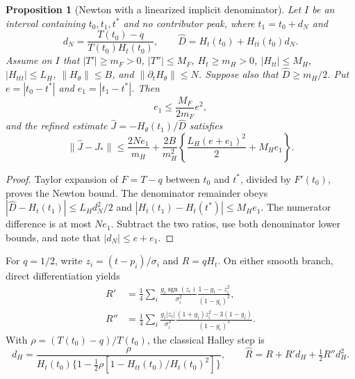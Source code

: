 \documentclass[11pt,a4paper]{article}
\newtheorem{proposition}[theorem]{Proposition}
\newcommand{\sgn}{\operatorname{sgn}}
\begin{document}
\begin{proposition}[Newton with a linearized implicit denominator]
Let $I$ be an interval containing $t_0,t_1,t^*$ and no contributor peak,
where $t_1=t_0+d_N$ and
\[
 d_N=\frac{T(t_0)-q}{T(t_0)H_t(t_0)},\qquad
 \widehat D=H_t(t_0)+H_{tt}(t_0)d_N.
\]
Assume on $I$ that $|T'|\geq m_F>0$, $|T''|\leq M_F$,
$H_t\geq m_H>0$, $|H_{tt}|\leq M_H$, $|H_{ttt}|\leq L_H$,
$\|H_\theta\|\leq B$, and $\|\partial_tH_\theta\|\leq N$.
Suppose also that $\widehat D\geq m_H/2$. Put $e=|t_0-t^*|$
and $e_1=|t_1-t^*|$. Then
\[
 e_1\leq\frac{M_F}{2m_F}e^2,
\]
and the refined estimate $\widehat J=-H_\theta(t_1)/\widehat D$ satisfies
\[
 \|\widehat J-J_*\|\leq
 \frac{2Ne_1}{m_H}+\frac{2B}{m_H^2}
 \left\{\frac{L_H(e+e_1)^2}{2}+M_He_1\right\}.
\]
\end{proposition}
\begin{proof}
Taylor expansion of $F=T-q$ between $t_0$ and $t^*$, divided by
$F'(t_0)$, proves the Newton bound. The denominator remainder obeys
$|\widehat D-H_t(t_1)|\leq L_Hd_N^2/2$ and
$|H_t(t_1)-H_t(t^*)|\leq M_He_1$. The numerator difference is at
most $Ne_1$. Subtract the two ratios, use both denominator lower bounds,
and note that $|d_N|\leq e+e_1$.
\end{proof}

For $q=1/2$, write $z_i=(t-p_i)/\sigma_i$ and $R=qH_t$.
On either smooth branch, direct differentiation yields
\begin{align}
 R'&=\frac14\sum_i\frac{g_i\sgn(z_i)}{\sigma_i^2}
       \frac{1-g_i-z_i^2}{(1-g_i)^2},\\
 R''&=\frac14\sum_i\frac{g_i|z_i|}{\sigma_i^3}
       \frac{(1+g_i)z_i^2-3(1-g_i)}{(1-g_i)^3}.
\end{align}
With $\rho=(T(t_0)-q)/T(t_0)$, the classical Halley step is
\[
 d_H=\frac{\rho}{H_t(t_0)\{1-\tfrac12\rho
             [1-H_{tt}(t_0)/H_t(t_0)^2]\}},\qquad
 \widehat R=R+R'd_H+\tfrac12R''d_H^2.
\]
\end{document}
